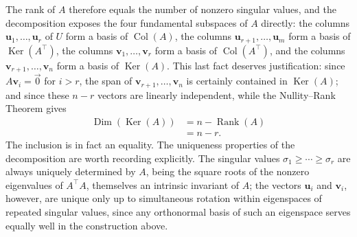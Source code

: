 The rank of $A$ therefore equals the number of nonzero singular values, and the decomposition exposes the four fundamental subspaces of $A$ directly: the columns $\mathbf{u}_1, \dots, \mathbf{u}_r$ of $U$ form a basis of $\operatorname{Col}(A)$, the columns $\mathbf{u}_{r+1}, \dots, \mathbf{u}_m$ form a basis of $\operatorname{Ker}(A^{\top})$, the columns $\mathbf{v}_1, \dots, \mathbf{v}_r$ form a basis of $\operatorname{Col}(A^{\top})$, and the columns $\mathbf{v}_{r+1}, \dots, \mathbf{v}_n$ form a basis of $\operatorname{Ker}(A)$. This last fact deserves justification: since $A\mathbf{v}_i = \vec{0}$ for $i > r$, the span of $\mathbf{v}_{r+1}, \dots, \mathbf{v}_n$ is certainly contained in $\operatorname{Ker}(A)$; and since these $n-r$ vectors are linearly independent, while the Nullity--Rank Theorem gives
\[
\begin{aligned}
\operatorname{Dim}(\operatorname{Ker}(A)) &= n - \operatorname{Rank}(A) \\
&= n-r.
\end{aligned}
\]
The inclusion is in fact an equality. The uniqueness properties of the decomposition are worth recording explicitly. The singular values $\sigma_1 \geq \cdots \geq \sigma_r$ are always uniquely determined by $A$, being the square roots of the nonzero eigenvalues of $A^{\top}A$, themselves an intrinsic invariant of $A$; the vectors $\mathbf{u}_i$ and $\mathbf{v}_i$, however, are unique only up to simultaneous rotation within eigenspaces of repeated singular values, since any orthonormal basis of such an eigenspace serves equally well in the construction above.

